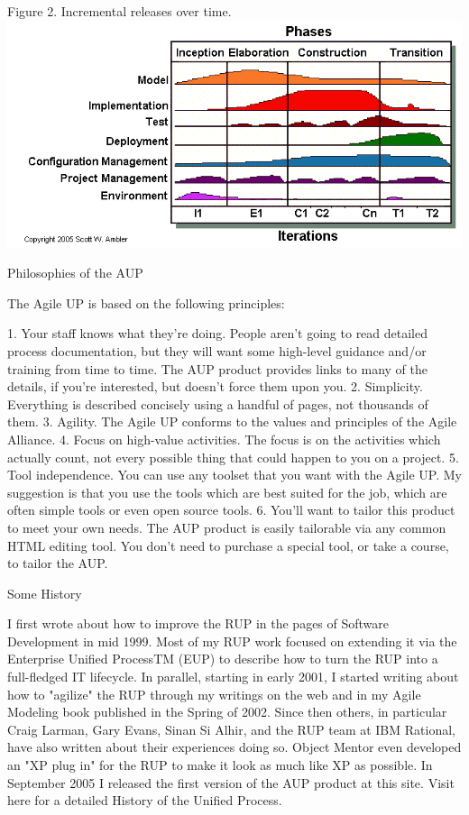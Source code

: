 \documentclass[spanish]{article}
\begin{document}
Figure 2. Incremental releases over time.
\includegraphics[scale=0.5]{lifecycleAgileUP}

Philosophies of the AUP

The Agile UP is based on the following principles:

   1. Your staff knows what they're doing.  People aren't going to read detailed process documentation, but they will want some high-level guidance and/or training from time to time.  The AUP product provides links to many of the details, if you're interested, but doesn't force them upon you.
   2. Simplicity.  Everything is described concisely using a handful of pages, not thousands of them.
   3. Agility.  The Agile UP conforms to the values and principles of the Agile Alliance.
   4. Focus on high-value activities.  The focus is on the activities which actually count, not every possible thing that could happen to you on a project.
   5. Tool independence.  You can use any toolset that you want with the Agile UP.  My suggestion is that you use the tools which are best suited for the job, which are often simple tools or even open source tools.
   6. You'll want to tailor this product to meet your own needs.  The AUP product is easily tailorable via any common HTML editing tool.  You don't need to purchase a special tool, or take a course, to tailor the AUP.

 
Some History

I first wrote about how to improve the RUP in the pages of Software Development in mid 1999.  Most of my RUP work focused on extending it via the Enterprise Unified ProcessTM (EUP) to describe how to turn the RUP into a full-fledged IT lifecycle.  In parallel, starting in early 2001, I started writing about how to "agilize" the RUP through my writings on the web and in my Agile Modeling book published in the Spring of 2002.  Since then others, in particular Craig Larman, Gary Evans, Sinan Si Alhir, and the RUP team at IBM Rational, have also written about their experiences doing so.  Object Mentor even developed an "XP plug in" for the RUP to make it look as much like XP as possible.  In September 2005 I released the first version of the AUP product at this site.  Visit here for a detailed History of the Unified Process.
\end{document}
